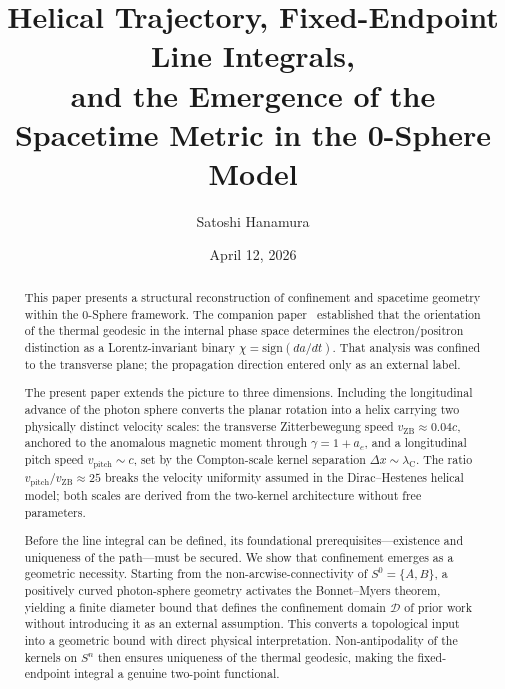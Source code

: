 \documentclass[%
 reprint, amsmath,amssymb, aps, prb, ]{revtex4-2}
\numberwithin{equation}{section}
\newcommand{\lambdaC}{\lambda_{\mathrm{C}}}
\begin{document}

\title{Helical Trajectory, Fixed-Endpoint Line Integrals,\\ and the Emergence of the Spacetime Metric in the 0-Sphere Model}

\author{Satoshi Hanamura}
\date{April 12, 2026}

\begin{abstract}
This paper presents a structural reconstruction of confinement and spacetime geometry within the 0-Sphere framework. The companion paper~\cite{hanamura50} established that the orientation of the thermal geodesic in the internal phase space determines the electron/positron distinction as a Lorentz-invariant binary $\chi = \mathrm{sign}(da/dt)$.
That analysis was confined to the transverse plane; the propagation direction entered only as an external label.

The present paper extends the picture to three dimensions.
Including the longitudinal advance of the photon sphere converts the planar rotation into a helix carrying two physically distinct velocity scales: the transverse Zitterbewegung speed $v_{\mathrm{ZB}}\approx 0.04c$, anchored to the anomalous magnetic moment through $\gamma = 1+a_e$, and a longitudinal pitch speed $v_{\mathrm{pitch}}\sim c$, set by the Compton-scale kernel separation $\Delta x\sim\lambdaC$.
The ratio $v_{\mathrm{pitch}}/v_{\mathrm{ZB}}\approx 25$ breaks the velocity uniformity assumed in the Dirac--Hestenes helical model; both scales are derived from the two-kernel architecture without free parameters.

Before the line integral can be defined, its foundational prerequisites---existence and uniqueness of the path---must be secured.
We show that confinement emerges as a geometric necessity.
Starting from the non-arcwise-connectivity of $S^0 = \{A,B\}$, a positively curved photon-sphere geometry activates the Bonnet--Myers theorem, yielding a finite diameter bound that defines the confinement domain $\mathcal{D}$ of prior work~\cite{hanamura33} without introducing it as an external assumption.
This converts a topological input into a geometric bound with direct physical interpretation.
Non-antipodality of the kernels on $S^n$ then ensures uniqueness of the thermal geodesic, making the fixed-endpoint integral a genuine two-point functional.


\end{abstract}
\end{document}
